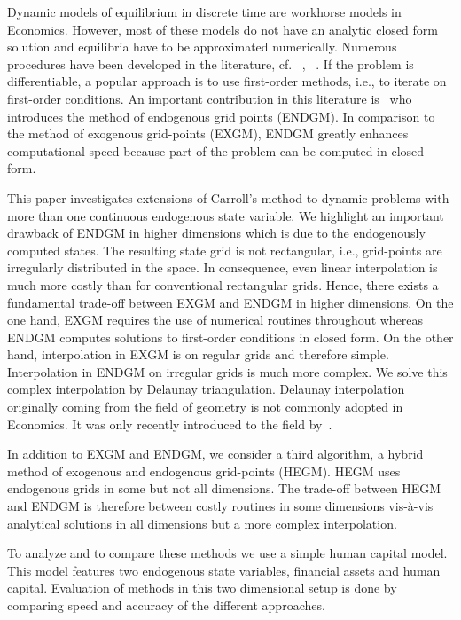 \documentclass[a4paper,12pt]{article}%
\begin{document}
Dynamic models of equilibrium in discrete time are workhorse models in
Economics. However, most of these models do not have an analytic closed form
solution and equilibria have to be approximated numerically. Numerous
procedures have been developed in the literature, cf.~%
%
,~%
%
. If the problem is differentiable, a popular approach is to use first-order
methods, i.e., to iterate on first-order conditions. An important contribution
in this literature is~%
who introduces the method of endogenous grid points (ENDGM). In comparison to
the method of exogenous grid-points (EXGM), ENDGM greatly enhances
computational speed because part of the problem can be computed in closed form.

This paper investigates extensions of Carroll's method to dynamic problems
with more than one continuous endogenous state variable. We highlight an
important drawback of ENDGM in higher dimensions which is due to the
endogenously computed states. The resulting state grid is not rectangular,
i.e., grid-points are irregularly distributed in the space. In consequence,
even linear interpolation is much more costly than for conventional
rectangular grids. Hence, there exists a fundamental trade-off between EXGM
and ENDGM in higher dimensions. On the one hand, EXGM requires the use of
numerical routines throughout whereas ENDGM computes solutions to first-order
conditions in closed form. On the other hand, interpolation in EXGM is on
regular grids and therefore simple. Interpolation in ENDGM on irregular grids
is much more complex. We solve this complex interpolation by Delaunay
triangulation. Delaunay interpolation originally coming from the field of
geometry is not commonly adopted in Economics. It was only recently introduced
to the field by~.

In addition to EXGM and ENDGM, we consider a third algorithm, a hybrid method
of exogenous and endogenous grid-points (HEGM). HEGM uses endogenous grids in
some but not all dimensions. The trade-off between HEGM and ENDGM is therefore
between costly routines in some dimensions vis-\`{a}-vis analytical solutions
in all dimensions but a more complex interpolation.

To analyze and to compare these methods we use a simple human capital model.
This model features two endogenous state variables, financial assets and human
capital. Evaluation of methods in this two dimensional setup is done by
comparing speed and accuracy of the different approaches.
\end{document}
